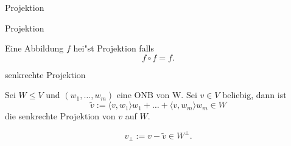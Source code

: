 \documentclass[class=article, crop=false]{standalone}
\begin{document}
\begin{zettel}{Projektion}
\begin{flashcard}[]{}
	\begin{question}
		Projektion
	\end{question}
	\begin{definition}[Projektion]
		Eine Abbildung $f$ hei"st Projektion falls
		\[
			f \circ f = f
		.\]
	\end{definition}
\end{flashcard}

\begin{flashcard}[]{}
	\begin{question}
		senkrechte Projektion
	\end{question}
	\begin{definition}
		Sei $W \leq  V$  und $( w_1,\dots,w_m)$ eine ONB von W. Sei $v \in V$ beliebig, dann ist
		\[
			\tilde{v} := \langle v,w_1\rangle w_1 + \dots + \langle v,w_m\rangle w_m \in  W
		\]
		die senkrechte Projektion von $v$  auf $W$.

	\end{definition}
\end{flashcard}

\begin{lemma}
	\[
		v_{\perp} := v - \tilde{v} \in  W^{\perp}
	.\]
\end{lemma}
\end{zettel}
\end{document}
